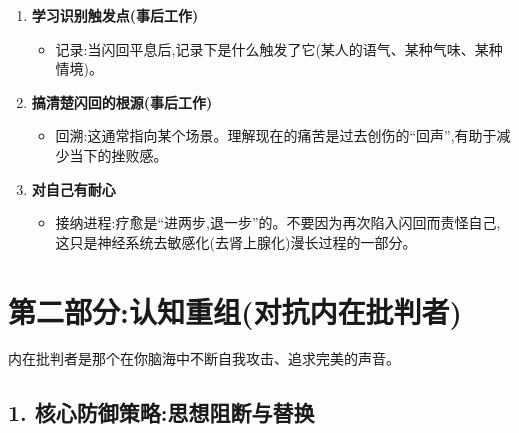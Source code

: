 \documentclass[11pt, a4paper]{article}
\begin{document}
\begin{enumerate}
    \item \textbf{学习识别触发点(事后工作)}
    \begin{itemize}
        \item 记录:当闪回平息后,记录下是什么触发了它(某人的语气、某种气味、某种情境)。
    \end{itemize}

    \item \textbf{搞清楚闪回的根源(事后工作)}
    \begin{itemize}
        \item 回溯:这通常指向某个场景。理解现在的痛苦是过去创伤的“回声”,有助于减少当下的挫败感。
    \end{itemize}

\newpage %

    \item \textbf{对自己有耐心}
    \begin{itemize}
        \item 接纳进程:疗愈是“进两步,退一步”的。不要因为再次陷入闪回而责怪自己,这只是神经系统去敏感化(去肾上腺化)漫长过程的一部分。
    \end{itemize}
\end{enumerate}

\begingroup
\small %
\linespread{1.3} \selectfont %

\section{第二部分:认知重组(对抗内在批判者)}

内在批判者是那个在你脑海中不断自我攻击、追求完美的声音。

\subsection*{1. 核心防御策略:思想阻断与替换}
\end{document}
